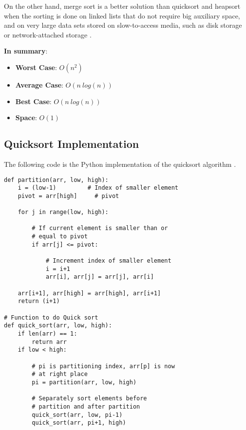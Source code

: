 On the other hand, merge sort is a better solution than quicksort and heapsort \cite{wikiheapsort} when the sorting is done on linked lists that do not require big auxiliary space, and on very large data sets stored on slow-to-access media, such as disk storage or network-attached storage \cite{wikiqicksort}.

\textbf{In summary}:
\begin{itemize}
\item \textbf{Worst Case}: \(O(n^{2})\)
\item \textbf{Average Case}: \(O(n\ log(n))\)
\item \textbf{Best Case}: \(O(n\ log(n))\)
\item \textbf{Space}: \(O(1)\)
\end{itemize}

\subsection{Quicksort Implementation}
The following code is the Python implementation of the quicksort algorithm \cite{quicksortcode}.
\begin{lstlisting}[firstnumber=1, caption={Quicksort Python implementation.}]
def partition(arr, low, high): 
    i = (low-1)         # Index of smaller element 
    pivot = arr[high]     # pivot 
  
    for j in range(low, high): 
  
        # If current element is smaller than or 
        # equal to pivot 
        if arr[j] <= pivot: 
  
            # Increment index of smaller element 
            i = i+1
            arr[i], arr[j] = arr[j], arr[i] 
  
    arr[i+1], arr[high] = arr[high], arr[i+1] 
    return (i+1) 
    
# Function to do Quick sort   
def quick_sort(arr, low, high): 
    if len(arr) == 1: 
        return arr 
    if low < high: 
  
        # pi is partitioning index, arr[p] is now 
        # at right place 
        pi = partition(arr, low, high) 
  
        # Separately sort elements before 
        # partition and after partition 
        quick_sort(arr, low, pi-1) 
        quick_sort(arr, pi+1, high)
    
\end{lstlisting}

